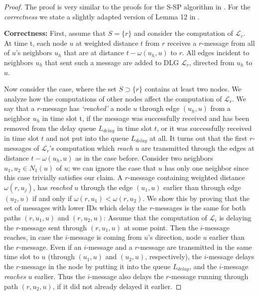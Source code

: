 \documentclass[11pt]{article}
\newcommand{\calL}{\mathcal{L}}
\newif\iffull
\newif\ifshort
\begin{document}
\ifshort
We state the proof of Lemma \ref{lemma:algdisp} in Appendix \ref{FULL:sec:aggregate}.
\fi
\iffull
\begin{proof}
The proof is very similar to the proofs for the S-SP algorithm in \cite{holzer2012optimal}. For the \textit{correctness} we state a slightly adapted version of Lemma 12 in \cite{holzer2012optimal}.

\textbf{Correctness: }
First, assume that $S=\{r\}$ and consider the computation of $\calL_r$. At time t, each node $u$ at weighted distance $t$ from $r$ receives a $r$-message from all of $u$'s neighbors $u_h$ that are at distance $t-\omega(u_h,u)$ to $r$. All edges incident to neighbors $u_h$ that sent such a message are added to DLG $\calL_r$, directed from $u_h$ to $u$.

Now consider the case, where the set $S\supset\{r\}$ contains at least two nodes.
We analyze how the computations of other nodes affect the computation of $\calL_r$. 
We say that a $r$-message has \textit{`reached'} a node $u$ through edge $(u_h, u)$ from a neighbor $u_h$ in time slot t, if the message was successfully received and has been removed from the delay queue $L_{delay}$ in time slot $t$, or it was successfully received in time slot $t$ and not put into the queue $L_{delay}$ at all.
It turns out that the first $r$-messages of $\calL_r$'s computation which \textit{reach} $u$ are transmitted through the edges at distance $t-\omega(u_h,u)$ as in the case before. Consider two neighbors $u_1,u_2\in N_1(u)$ of $u$; we can ignore the case that $u$ has only one neighbor since this case trivially satisfies our claim.
A $r$-message containing weighted distance $\omega(r,u_j)$, has \textit{reached} $u$ through the edge $(u_1,u)$ earlier than through edge $(u_2,u)$ if and only if $\omega(r,u_1)<\omega(r,u_2)$.
We show this by proving that the set of messages with lower IDs which delay the $r$-messages is the same for both paths $(r,u_1,u)$ and $(r,u_2,u)$: Assume that the computation of $\calL_i$ is delaying the $r$-message sent through $(r,u_1,u)$ at some point.
Then the $i$-message reaches, in case the $i$-message is coming from $u$'s direction, node $u$ earlier than the $r$-message.
Even if an $i$-message and a $r$-message are transmitted in the same time slot to $u$ (through $(u_1,u)$ and $(u_2,u)$, respectively), the $i$-message delays the $r$-message in the node by putting it into the queue $L_{delay}$, and the $i$-message \textit{reaches} $u$ earlier.
Thus the $i$-message also delays the $r$-message running through path $(r,u_2,u)$, if it did not already delayed it earlier.


\end{proof}
\end{document}
